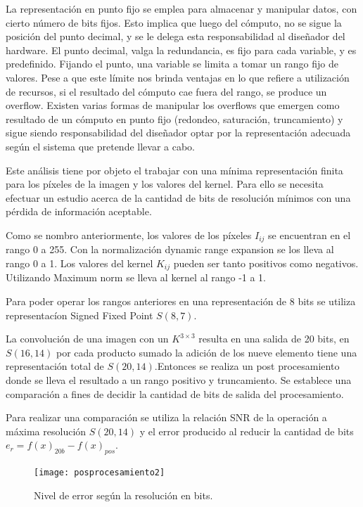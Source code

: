 La representación en punto fijo se emplea para
almacenar y manipular datos, con cierto número de bits fijos. Esto implica que
luego del cómputo, no se sigue la posición del punto decimal, y se le delega
esta responsabilidad al diseñador del hardware. El punto decimal, valga la
redundancia, es fijo para cada variable, y es predefinido. Fijando el punto, una
variable se limita a tomar un rango fijo de valores. Pese a que este límite nos
brinda ventajas en lo que refiere a utilización de recursos, si el resultado del
cómputo cae fuera del rango, se produce un overflow. Existen varias formas de
manipular los overflows que emergen como resultado de un cómputo en punto fijo
(redondeo, saturación, truncamiento) y sigue siendo responsabilidad del
diseñador optar por la representación adecuada según el sistema que pretende
llevar a cabo.

Este an\'alisis tiene por objeto el trabajar con una m\'inima representaci\'on
finita para los p\'ixeles de la imagen y los valores del kernel.
Para ello se necesita efectuar un estudio acerca de la cantidad de bits de
resoluci\'on m\'inimos  con una p\'erdida de informaci\'on aceptable.

Como se nombro anteriormente, los valores de los p\'ixeles \(I_{ij}\) se
encuentran en el rango 0 a 255. Con la normalización dynamic range
expansion se los lleva al rango 0 a 1. Los valores del kernel
\(K_{ij}\) pueden ser tanto positivos como negativos. Utilizando Maximum
norm se lleva al kernel al rango -1 a 1.

Para poder operar los rangos anteriores en una representaci\'on de 8 bits se
utiliza representac\'ion Signed Fixed Point\cite{fix_p} \(S(8,7)\). 

La convoluci\'on de una imagen con un $K^{3{\times}3}$ resulta en una 
salida de 20 bits, en \(S(16,14)\) por cada producto sumado la adici\'on de los nueve
elemento tiene una representaci\'on total de \(S(20,14)\).Entonces se realiza un
post procesamiento donde se lleva el resultado a un rango positivo y truncamiento.
Se establece una comparaci\'on a fines de decidir la cantidad de bits de salida del
procesamiento.

Para realizar una comparaci\'on se utiliza la relaci\'on SNR de la operaci\'on a
m\'axima resoluci\'on \(S(20,14)\) y el error producido al reducir la cantidad
de bits \(e_r=f(x)_{20b}-f(x)_{pos}\)\cite{srntesis}.

\begin{figure}
\centering
\texttt{[image: posprocesamiento2]}
\caption{Nivel de error según la resolución en bits.}
\label{prepro}
\end{figure}

